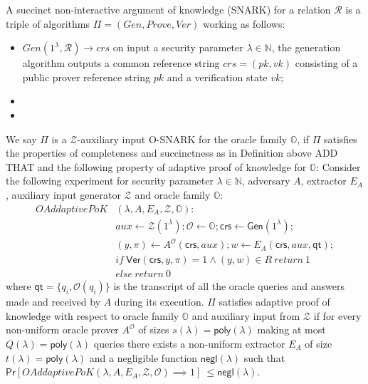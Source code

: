 \begin{definition}[O-SNARKs]
\label{def:osnarks}
A succinct non-interactive argument of knowledge (SNARK) for a relation $\mathcal{R}$ is a triple of algorithms 
$\Pi=(\mathit{Gen}, \mathit{Prove}, \mathit{Ver})$ working as follows:
\begin{itemize}
\item $\mathit{Gen}(1^{\lambda},\mathcal{R}) \rightarrow \mathit{crs}$
on input a security parameter $\lambda \in \mathbb{N}$, the generation algorithm outputs
a common reference string $\mathit{crs} = (\mathit{pk},\mathit{vk})$ 
consisting of a public prover reference string $\mathit{pk}$ and a verification state $\mathit{vk}$;
\item 
\item
\end{itemize}
We say $\Pi$ is a $\mathcal{Z}$-auxiliary input O-SNARK for the oracle family $\mathbb{O}$, 
if $\Pi$ satisfies the properties of completeness and 
succinctness as in Definition above {\color{red} ADD THAT} 
and the following property of adaptive proof of knowledge for $\mathbb{O}$:
Consider the following experiment for security parameter $\lambda \in \mathbb{N}$, 
adversary $A$, extractor $E_A$, auxiliary input generator $\mathcal{Z}$ and oracle family $\mathbb{O}$:\\
\begin{align*}
\mathit{OAddaptivePoK}&(\lambda, A, E_A, \mathcal{Z}, \mathbb{O}): \\
& \mathit{aux} \leftarrow \mathcal{Z}(1^{\lambda}); \mathcal{O} \leftarrow \mathbb{O}; \mathsf{crs} \leftarrow \mathsf{Gen}(1^{\lambda}); \\
& (y,\pi) \leftarrow A^{\mathcal{O}}(\mathsf{crs},\mathit{aux}); w \leftarrow E_A(\mathsf{crs}, \mathit{aux}, \mathsf{qt}); \\
& if \ \mathsf{Ver}(\mathsf{crs}, y, \pi) = 1 \wedge (y,w) \in R \ return  \ 1 \\
& else \ return \ 0
\end{align*}
\noindent where $\mathsf{qt} = \{q_i, \mathcal{O}(q_i)\}$ is the transcript of all the oracle queries and answers made and received by $A$ during its execution. 
$\Pi$ satisfies adaptive proof of knowledge with respect to oracle family  $\mathbb{O}$ and auxiliary input from $\mathcal{Z}$ 
if for every non-uniform oracle prover $A^{\mathcal{O}}$ of sizes $s(\lambda)= \mathsf{poly}(\lambda)$ making at most 
$Q(\lambda) = \mathsf{poly}(\lambda)$ queries there exists a non-uniform extractor $E_A$ of size $t(\lambda)=\mathsf{poly}(\lambda)$ 
and a negligible function $\mathsf{negl}(\lambda)$ 
such that $\mathsf{Pr}[\mathit{OAddaptivePoK}(\lambda, A, E_A, \mathcal{Z}, \mathcal{O}) \implies  1]\ \leq \mathsf{negl}(\lambda)$. 
\end{definition} 

